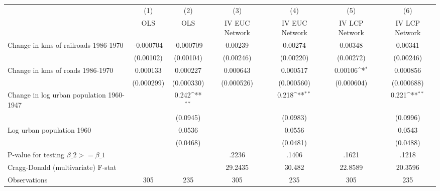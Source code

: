 {
\def\sym#1{\ifmmode^{#1}\else\(^{#1}\)\fi}
\begin{tabular}{l*{6}{c}}
\hline\hline
                &\multicolumn{1}{c}{(1)}&\multicolumn{1}{c}{(2)}&\multicolumn{1}{c}{(3)}&\multicolumn{1}{c}{(4)}&\multicolumn{1}{c}{(5)}&\multicolumn{1}{c}{(6)}\\
                &\multicolumn{1}{c}{OLS}&\multicolumn{1}{c}{OLS}&\multicolumn{1}{c}{IV EUC Network}&\multicolumn{1}{c}{IV EUC Network}&\multicolumn{1}{c}{IV LCP Network}&\multicolumn{1}{c}{IV LCP Network}\\
\hline
Change in kms of railroads 1986-1970&-0.000704         &-0.000709         &  0.00239         &  0.00274         &  0.00348         &  0.00341         \\
                &(0.00102)         &(0.00104)         &(0.00246)         &(0.00220)         &(0.00272)         &(0.00246)         \\
[1em]
Change in kms of roads 1986-1970& 0.000133         & 0.000227         & 0.000643         & 0.000517         &  0.00106\sym{*}  & 0.000856         \\
                &(0.000299)         &(0.000330)         &(0.000526)         &(0.000560)         &(0.000604)         &(0.000688)         \\
[1em]
Change in log urban population 1960-1947&                  &    0.242\sym{**} &                  &    0.218\sym{**} &                  &    0.221\sym{**} \\
                &                  & (0.0945)         &                  & (0.0983)         &                  & (0.0996)         \\
[1em]
Log urban population 1960&                  &   0.0536         &                  &   0.0556         &                  &   0.0543         \\
                &                  & (0.0468)         &                  & (0.0481)         &                  & (0.0488)         \\
\hline
P-value for testing $\beta\_{2} >= \beta\_{1}$&                  &                  &    .2236         &    .1406         &    .1621         &    .1218         \\
Cragg-Donald (multivariate) F-stat&                  &                  &  29.2435         &   30.482         &  22.8589         &  20.3596         \\
Observations    &      305         &      235         &      305         &      235         &      305         &      235         \\
\hline\hline
\end{tabular}
}
